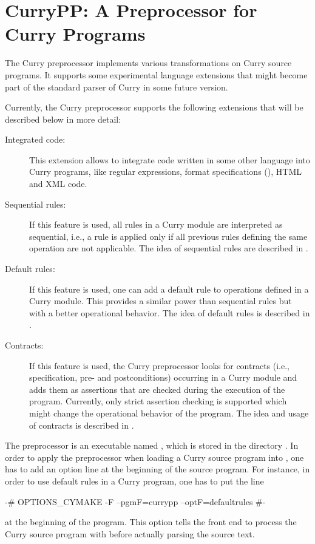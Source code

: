 \section{CurryPP: A Preprocessor for Curry Programs}

The Curry preprocessor 
implements
various transformations on Curry source programs.
It supports some experimental language extensions
that might become part of the standard parser of Curry
in some future version.

Currently, the Curry preprocessor
supports the following extensions that will be described below in more detail:

\begin{description}
\item[Integrated code:]
This extension allows to integrate
code written in some other language into Curry programs,
like regular expressions, format specifications (),
HTML and XML code.
\item[Sequential rules:]
If this feature is used, all rules in a Curry module are
interpreted as sequential, i.e., a rule is applied only
if all previous rules defining the same operation are not applicable.
The idea of sequential rules are described in \cite{AntoyHanus14}.
\item[Default rules:]
If this feature is used, one can add a default rule
to operations defined in a Curry module.
This provides a similar power than sequential rules
but with a better operational behavior.
The idea of default rules is described in \cite{AntoyHanus16PADL}.
\item[Contracts:]
If this feature is used, the Curry preprocessor looks for contracts
(i.e., specification, pre- and postconditions) occurring in a Curry module
and adds them as assertions that are checked during
the execution of the program.
Currently, only strict assertion checking is supported
which might change the operational behavior of the program.
The idea and usage of contracts is described in \cite{AntoyHanus12PADL}.
\end{description}
%
The preprocessor is an executable named ,
which is stored in the directory .
In order to apply the preprocessor when loading a Curry source
program into \CYS, one has to add an option line
at the beginning of the source program.
For instance, in order to use default rules in a Curry program,
one has to put the line
\begin{curry}
{-# OPTIONS_CYMAKE -F --pgmF=currypp --optF=defaultrules #-}
\end{curry}
at the beginning of the program.
This option tells the \CYS front end to process the Curry source program
with  before actually parsing the source text.

